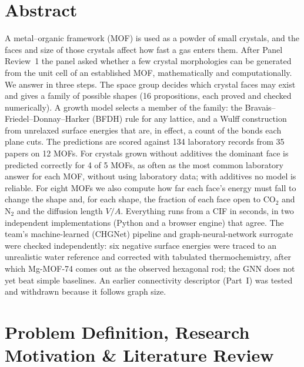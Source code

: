 \documentclass[11pt, a4paper]{article}
\begin{document}
\section{Abstract}
\noindent
A metal--organic framework (MOF) is used as a powder of small crystals, and the faces and size of those crystals affect how fast a gas enters them. After Panel Review~1 the panel asked whether a few crystal morphologies can be generated from the unit cell of an established MOF, mathematically and computationally. We answer in three steps. The space group decides which crystal faces may exist and gives a family of possible shapes (16 propositions, each proved and checked numerically). A growth model selects a member of the family: the Bravais--Friedel--Donnay--Harker (BFDH) rule for any lattice, and a Wulff construction from unrelaxed surface energies that are, in effect, a count of the bonds each plane cuts. The predictions are scored against 134 laboratory records from 35 papers on 12 MOFs. For crystals grown without additives the dominant face is predicted correctly for 4 of 5 MOFs, as often as the most common laboratory answer for each MOF, without using laboratory data; with additives no model is reliable. For eight MOFs we also compute how far each face's energy must fall to change the shape and, for each shape, the fraction of each face open to CO$_2$ and N$_2$ and the diffusion length $V/A$. Everything runs from a CIF in seconds, in two independent implementations (Python and a browser engine) that agree. The team's machine-learned (CHGNet) pipeline and graph-neural-network surrogate were checked independently: six negative surface energies were traced to an unrealistic water reference and corrected with tabulated thermochemistry, after which Mg-MOF-74 comes out as the observed hexagonal rod; the GNN does not yet beat simple baselines. An earlier connectivity descriptor (Part~I) was tested and withdrawn because it follows graph size.

\section{Problem Definition, Research Motivation \& Literature Review}
\end{document}
